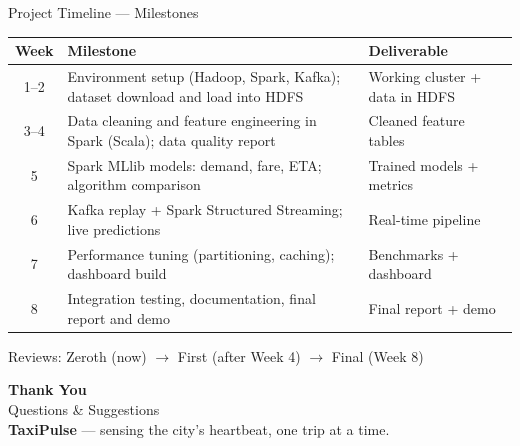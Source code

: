 \documentclass[aspectratio=169]{beamer}
\begin{document}
\begin{frame}{Project Timeline --- Milestones}
  \small
  \begin{tabular}{c p{} p{}}
    \toprule
    \textbf{Week} & \textbf{Milestone} & \textbf{Deliverable} \\
    \midrule
    1--2 & Environment setup (Hadoop, Spark, Kafka); dataset download and load into HDFS & Working cluster + data in HDFS \\
    3--4 & Data cleaning and feature engineering in Spark (Scala); data quality report & Cleaned feature tables \\
    5    & Spark MLlib models: demand, fare, ETA; algorithm comparison & Trained models + metrics \\
    6    & Kafka replay + Spark Structured Streaming; live predictions & Real-time pipeline \\
    7    & Performance tuning (partitioning, caching); dashboard build & Benchmarks + dashboard \\
    8    & Integration testing, documentation, final report and demo & Final report + demo \\
    \bottomrule
  \end{tabular}
  \vspace{6pt}
  \begin{center}
    \scriptsize Reviews: Zeroth (now) $\rightarrow$ First (after Week 4) $\rightarrow$ Final (Week 8)
  \end{center}
\end{frame}

\begin{frame}
  \begin{center}
    {\Huge \textbf{\textcolor{pulseblue}{Thank You}}}\\[10pt]
    {\large Questions \& Suggestions}\\[16pt]
    {\small \textbf{TaxiPulse} --- sensing the city's heartbeat, one trip at a time.}
  \end{center}
\end{frame}
\end{document}
